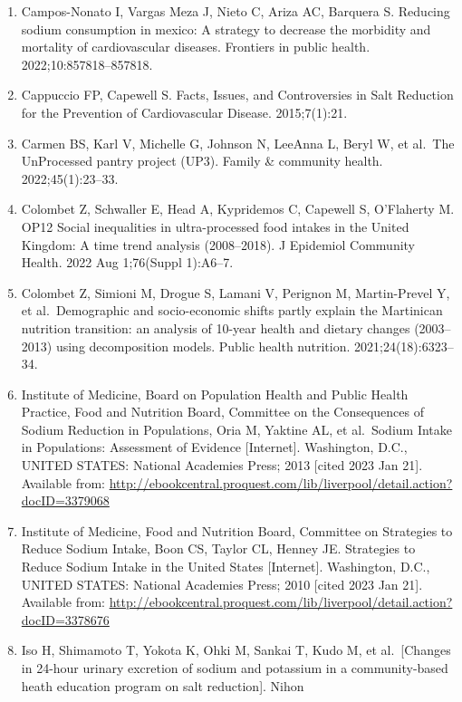 \documentclass[
]{article}
\providecommand{\tightlist}{%
  \setlength{\itemsep}{0pt}\setlength{\parskip}{0pt}}
\begin{document}
\begin{enumerate}
\def\labelenumi{\arabic{enumi}.}
\tightlist
\item
  Campos-Nonato I, Vargas Meza J, Nieto C, Ariza AC, Barquera S.
  Reducing sodium consumption in mexico: A strategy to decrease the
  morbidity and mortality of cardiovascular diseases. Frontiers in
  public health. 2022;10:857818--857818.
\item
  Cappuccio FP, Capewell S. Facts, Issues, and Controversies in Salt
  Reduction for the Prevention of Cardiovascular Disease. 2015;7(1):21.
\item
  Carmen BS, Karl V, Michelle G, Johnson N, LeeAnna L, Beryl W, et
  al.~The UnProcessed pantry project (UP3). Family \& community health.
  2022;45(1):23--33.
\item
  Colombet Z, Schwaller E, Head A, Kypridemos C, Capewell S, O'Flaherty
  M. OP12 Social inequalities in ultra-processed food intakes in the
  United Kingdom: A time trend analysis (2008--2018). J Epidemiol
  Community Health. 2022 Aug 1;76(Suppl 1):A6--7.
\item
  Colombet Z, Simioni M, Drogue S, Lamani V, Perignon M, Martin-Prevel
  Y, et al.~Demographic and socio-economic shifts partly explain the
  Martinican nutrition transition: an analysis of 10-year health and
  dietary changes (2003--2013) using decomposition models. Public health
  nutrition. 2021;24(18):6323--34.
\item
  Institute of Medicine, Board on Population Health and Public Health
  Practice, Food and Nutrition Board, Committee on the Consequences of
  Sodium Reduction in Populations, Oria M, Yaktine AL, et al.~Sodium
  Intake in Populations: Assessment of Evidence {[}Internet{]}.
  Washington, D.C., UNITED STATES: National Academies Press; 2013
  {[}cited 2023 Jan 21{]}. Available from:
  \url{http://ebookcentral.proquest.com/lib/liverpool/detail.action?docID=3379068}
\item
  Institute of Medicine, Food and Nutrition Board, Committee on
  Strategies to Reduce Sodium Intake, Boon CS, Taylor CL, Henney JE.
  Strategies to Reduce Sodium Intake in the United States
  {[}Internet{]}. Washington, D.C., UNITED STATES: National Academies
  Press; 2010 {[}cited 2023 Jan 21{]}. Available from:
  \url{http://ebookcentral.proquest.com/lib/liverpool/detail.action?docID=3378676}
\item
  Iso H, Shimamoto T, Yokota K, Ohki M, Sankai T, Kudo M, et
  al.~{[}Changes in 24-hour urinary excretion of sodium and potassium in
  a community-based heath education program on salt reduction{]}. Nihon

\end{enumerate}
\end{document}

